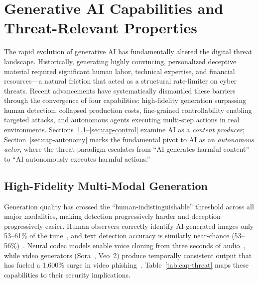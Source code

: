 
\section{Generative AI Capabilities and Threat-Relevant Properties}
\label{sec:capabilities}

The rapid evolution of generative AI has fundamentally altered the digital threat landscape. Historically, generating highly convincing, personalized deceptive material required significant human labor, technical expertise, and financial resources---a natural friction that acted as a structural rate-limiter on cyber threats. Recent advancements have systematically dismantled these barriers through the convergence of four capabilities: high-fidelity generation surpassing human detection, collapsed production costs, fine-grained controllability enabling targeted attacks, and autonomous agents executing multi-step actions in real environments. Sections~\ref{sec:cap-fidelity}--\ref{sec:cap-control} examine AI as a \emph{content producer}; Section~\ref{sec:cap-autonomy} marks the fundamental pivot to AI as an \emph{autonomous actor}, where the threat paradigm escalates from ``AI generates harmful content'' to ``AI autonomously executes harmful actions.''


\subsection{High-Fidelity Multi-Modal Generation}
\label{sec:cap-fidelity}

Generation quality has crossed the ``human-indistinguishable'' threshold across all major modalities, making detection progressively harder and deception progressively easier. Human observers correctly identify AI-generated images only 53--61\% of the time~\cite{microsoft2025human}, and text detection accuracy is similarly near-chance (53--56\%)~\cite{uchendu2023human}. Neural codec models enable voice cloning from three seconds of audio~\cite{wang2023valle}, while video generators (Sora~\cite{brooks2024sora}, Veo~2) produce temporally consistent output that has fueled a 1,600\% surge in video phishing~\cite{vectra2025whaling}. Table~\ref{tab:cap-threat} maps these capabilities to their security implications.


